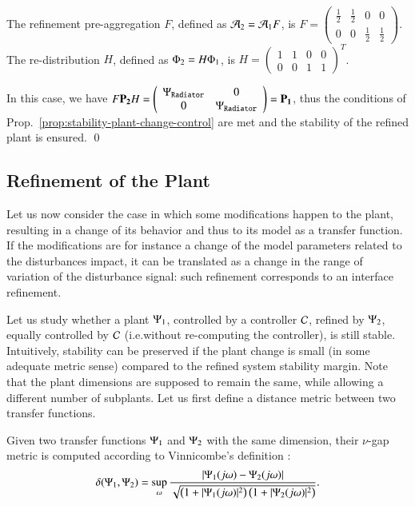 \documentclass[runningheads]{llncs}
\makeatletter
\newcommand{\prop}[1]{Prop.~\ref{prop:#1}}
\newcommand{\ie}[1][\@ ]{i.e.{#1}}
\newcommand{\profile}[1][]{\Phi\ifx#1\relax\else^{#1}\fi}
\newcommand{\aggregation}[1][]{\mathcal{A}\ifx#1\relax\else^{#1}\fi}
\newcommand{\plant}[1][]{\Psi\ifx#1\relax\else^{#1}\fi}
\newcommand{\subplant}[1][]{P\ifx#1\relax\else^{#1}\fi}
\newcommand{\controller}[1][]{\mathcal{C}\ifx#1\relax\else^{#1}\fi}
\newcommand{\predicatename}[1]{\mathtt{#1}}
\makeatother
\begin{document}
\begin{example}
The refinement pre-aggregation $F$, defined as $\aggregation_2 = \aggregation_1 F$, is
$F = \left(\begin{array}{cccc}
         \frac{1}{2} & \frac{1}{2} & 0 & 0 \\
         0 & 0 & \frac{1}{2} & \frac{1}{2}        
    \end{array}\right)$.
The re-distribution $H$, defined as $\profile_2 = H \profile_1$, is
$H = \left(\begin{array}{cccc}
  1 & 1 & 0 & 0 \\
  0 & 0 & 1 & 1
\end{array}\right)^T$.

    
In this case, we have $F \mathbf{\subplant_2} H = \left(\begin{array}{cc}
  \plant_\predicatename{Radiator} & 0 \\
  0 & \plant_\predicatename{Radiator}
\end{array}\right) = \mathbf{\subplant_1}$, thus the conditions of \prop{stability-plant-change-control} are met and the stability of the refined plant is ensured. 
  \qed
\end{example}


\subsection{Refinement of the Plant}


Let us now consider the case in which some modifications happen to the plant, resulting in a change of its behavior and thus to its model as a transfer function. If the modifications are for instance a change of the model parameters related to the disturbances impact, it can be translated as a change in the range of variation of the disturbance signal: such refinement corresponds to an interface refinement.  

Let us study whether a plant \( \plant_1 \), controlled by a controller \( \controller \), refined by \( \plant_2 \), equally controlled by \( \controller \) (\ie without re-computing the controller), is still stable.
Intuitively, stability can be preserved if the plant change is small (in some adequate metric sense) compared to the refined system stability margin. 
Note that the plant dimensions are supposed to remain the same, while allowing a different number of subplants.
Let us first define a distance metric between two transfer functions.

\begin{definition}\label{defn:nu-ga-metric}
Given two transfer functions $\plant_1$ and $\plant_2$ with the same dimension, their \(\nu\)-gap metric is computed according to Vinnicombe's definition \cite{vinnicombe2000uncertainty}:
\begin{equation}
    \label{eq:nu-gap-metric}
    \delta(\plant_1,\plant_2) = \sup_\omega \frac{|\plant_1(j\omega) - \plant_2(j\omega)|}{\sqrt{\left( 1 + |\plant_1(j\omega)|^2 \right)\left( 1 + |\plant_2(j\omega)|^2 \right)}}.
\end{equation}
    
\end{definition}
\end{document}
